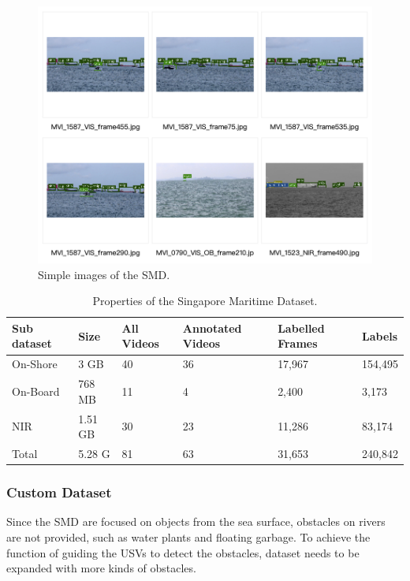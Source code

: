 \documentclass[sensors,article,submit,moreauthors,pdftex]{Definitions/mdpi}
\begin{document}
\begin{figure}[htbp]
\centering
\includegraphics[width=1\columnwidth]{images/SMD-example.png}
\caption{Simple images of the SMD.}
\label{fig:Simple images of the SMD}
\end{figure}

\begin{table}[htbp]
\centering
\caption{Properties of the Singapore Maritime Dataset.}
\begin{tabular}{llllll} 
\toprule
\textbf{Sub dataset}&\textbf{Size}&\textbf{All Videos}&\textbf{Annotated Videos}&\textbf{Labelled Frames}& \textbf{Labels}\\
\midrule
On-Shore & 3 GB& 40 & 36 & 17,967& 154,495\\
On-Board & 768 MB&  11 &4 &2,400& 3,173\\
NIR& 1.51 GB&  30&23 & 11,286& 83,174\\
\cmidrule(r){1-6}
Total& 5.28 G&  81 &63 & 31,653 &240,842\\
\bottomrule
\end{tabular}
\label{tbl:Properties of Singapore Maritime Dataset}
\end{table}


\subsubsection{Custom Dataset}

Since the SMD are focused on objects from the sea surface, obstacles on rivers are not provided, such as water plants and floating garbage. To achieve the function of guiding the USVs to detect the obstacles, dataset needs to be expanded with more kinds of obstacles.
\end{document}
